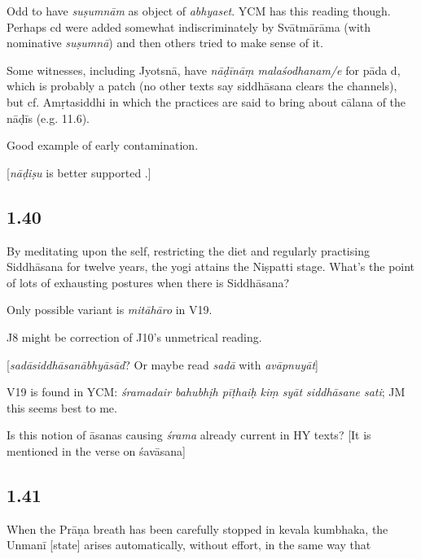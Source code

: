 \begin{ekdosis}
\begin{philcomm}[hp01_039]
Odd to have \emph{suṣumnām} as object of \emph{abhyaset}. YCM has this reading though. Perhaps cd were added somewhat indiscriminately by Svātmārāma (with nominative \emph{suṣumnā}) and then others tried to make sense of it.

Some witnesses, including Jyotsnā, have \emph{nāḍīnāṃ malaśodhanam/e} for pāda d, which is probably a patch (no other texts say siddhāsana clears the channels), but cf. Amṛtasiddhi in which the practices are said to bring about cālana of the nāḍīs (e.g. 11.6).

Good example of early contamination.

[\emph{nāḍiṣu} is better supported .]
\end{philcomm}

\subsection*{1.40}
\begin{translation}[hp01_040]
By meditating upon the self, restricting the diet and regularly practising Siddhāsana for twelve years, the yogi attains the Niṣpatti stage.
What’s the point of lots of exhausting postures when there is Siddhāsana?
\end{translation}

\begin{philcomm}[hp01_040]
Only possible variant is \emph{mitāhāro} in V19.

J8 might be correction of J10’s unmetrical reading.

[\emph{sadāsiddhāsanābhyāsād}? Or maybe read \emph{sadā} with \emph{avāpnuyāt}]

V19 is found in YCM: \emph{śramadair bahubhịh pīṭhaiḥ kiṃ syāt siddhāsane sati}; JM this seems best to me.

Is this notion of āsanas causing \emph{śrama} already current in HY texts?
[It is mentioned in the verse on śavāsana]
\end{philcomm}

\subsection*{1.41}
\begin{translation}[hp01_041]
When the Prāṇa breath has been carefully stopped in kevala kumbhaka, the Unmanī [state] arises automatically, without effort, in the same way that
\end{translation}


\end{ekdosis}
